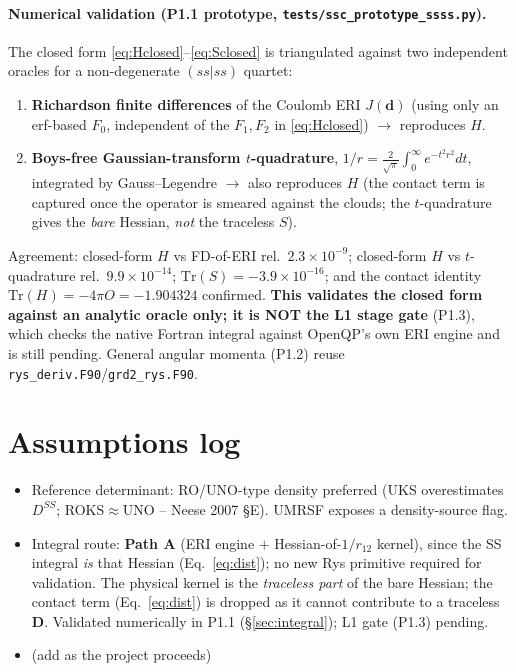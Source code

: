 \documentclass[11pt]{article}
\begin{document}
\paragraph{Numerical validation (P1.1 prototype, \texttt{tests/ssc\_prototype\_ssss.py}).} The
closed form \eqref{eq:Hclosed}--\eqref{eq:Sclosed} is triangulated against two independent oracles
for a non-degenerate $(ss|ss)$ quartet:
\begin{enumerate}
  \item \textbf{Richardson finite differences} of the Coulomb ERI $J(\mathbf d)$ (using only an
        erf-based $F_0$, independent of the $F_1,F_2$ in \eqref{eq:Hclosed}) $\to$ reproduces $H$.
  \item \textbf{Boys-free Gaussian-transform $t$-quadrature}, $1/r=\frac{2}{\sqrt\pi}\int_0^\infty
        e^{-t^2r^2}dt$, integrated by Gauss--Legendre $\to$ also reproduces $H$ (the contact term is
        captured once the operator is smeared against the clouds; the $t$-quadrature gives the
        \emph{bare} Hessian, \emph{not} the traceless $S$).
\end{enumerate}
Agreement: closed-form $H$ vs FD-of-ERI rel.\ $2.3\times10^{-9}$; closed-form $H$ vs $t$-quadrature
rel.\ $9.9\times10^{-14}$; $\mathrm{Tr}(S)=-3.9\times10^{-16}$; and the contact identity
$\mathrm{Tr}(H)=-4\pi O=-1.904324$ confirmed. \textbf{This validates the closed form against an
analytic oracle only; it is NOT the L1 stage gate} (P1.3), which checks the native Fortran integral
against OpenQP's own ERI engine and is still pending. General angular momenta (P1.2) reuse
\texttt{rys\_deriv.F90}/\texttt{grd2\_rys.F90}.

\section{Assumptions log}
\begin{itemize}
  \item Reference determinant: RO/UNO-type density preferred (UKS overestimates $D^{SS}$;
        ROKS$\approx$UNO -- Neese 2007 \S E). UMRSF exposes a density-source flag.
  \item Integral route: \textbf{Path A} (ERI engine $+$ Hessian-of-$1/r_{12}$ kernel), since the
        SS integral \emph{is} that Hessian (Eq.~\eqref{eq:dist}); no new Rys primitive required
        for validation. The physical kernel is the \emph{traceless part} of the bare Hessian;
        the contact term (Eq.~\eqref{eq:dist}) is dropped as it cannot contribute to a traceless
        $\mathbf D$. Validated numerically in P1.1 (\S\ref{sec:integral}); L1 gate (P1.3) pending.
  \item (add as the project proceeds)
\end{itemize}
\end{document}
